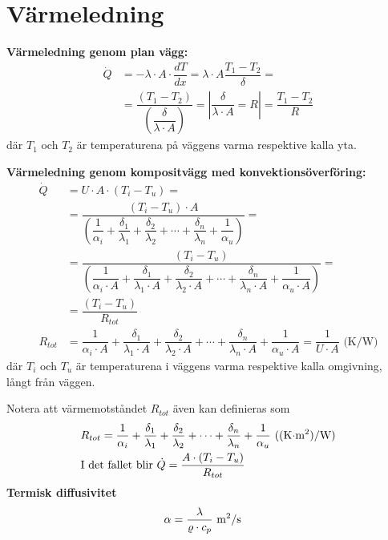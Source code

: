 \section*{Värmeledning}
\textbf{Värmeledning genom plan vägg: }
 \begin{align*}
	\dot{Q} & = - \lambda \cdot A \cdot \dfrac{dT}{dx} = \lambda \cdot A \dfrac{T_1-T_2}{\delta} = \\
		& = \dfrac{(T_1-T_2)}{\left(\dfrac{\delta}{\lambda \cdot A}\right)}  = \left| \dfrac{\delta}{\lambda \cdot A}=R \right| =\dfrac{T_1-T_2}{R}
 \end{align*}
 där $T_1$ och $T_2$ är temperaturena på väggens varma respektive kalla yta. \par
 \textbf{Värmeledning genom kompositvägg med konvektionsöverföring:} 
	\begin{align*}
		\dot{Q} &= U \cdot A \cdot (T_i - T_u) =\\
		& = \dfrac{(T_i-T_u) \cdot A}{\left(\dfrac{1}{\alpha_i}+\dfrac{\delta_1}{\lambda_1}+ \dfrac{\delta_2}{\lambda_2}+\cdots +\dfrac{\delta_n}{\lambda_n}+\dfrac{1}{\alpha_u}\right)} = \\
		 & = \dfrac{(T_i-T_u)}{\left(\dfrac{1}{\alpha_i \cdot A}+\dfrac{\delta_1}{\lambda_1 \cdot A}+ \dfrac{\delta_2}{\lambda_2 \cdot A}+\cdots +\dfrac{\delta_n}{\lambda_n\cdot A} +\dfrac{1}{\alpha_u \cdot A}\right)} = \\
		 & = \dfrac{(T_i-T_u)}{R_{tot}}\\
R_{tot} &= \dfrac{1}{\alpha_i \cdot A}+\dfrac{\delta_1}{\lambda_1 \cdot A}+ \dfrac{\delta_2}{\lambda_2 \cdot A}+\cdots +\dfrac{\delta_n}{\lambda_n\cdot A} +\dfrac{1}{\alpha_u \cdot A} = \dfrac{1}{U \cdot A} \text{ (K/W)}
	\end{align*}
 där $T_i$ och $T_u$ är temperaturena i väggens varma respektive kalla omgivning, långt från väggen. \par
 Notera att värmemotståndet $R_{tot}$ även kan definieras som
	\begin{align*}
	& R_{tot} =  \dfrac{1}{\alpha_i}+\dfrac{\delta_1}{\lambda_1}+ \dfrac{\delta_2}{\lambda_2}+\cdots +\dfrac{\delta_n}{\lambda_n}+\dfrac{1}{\alpha_u} \text{ ((K$\cdot$m\textsuperscript{2})/W}) \\
	& \text{I det fallet blir } \dot{Q} = \dfrac{A \cdot ( T_i - T_u )}{R_{tot}}
	\end{align*}
 \textbf{Termisk diffusivitet}
 \begin{align*}
&\alpha = \dfrac{\lambda}{\varrho \cdot c_p} \text{ m\textsuperscript{2}/s}
 \end{align*}
